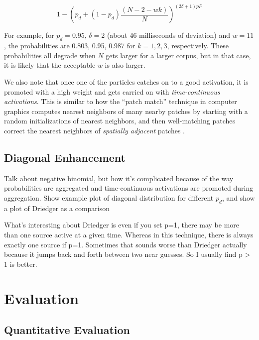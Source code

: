 \documentclass{article}
\begin{document}
\begin{equation}
    \label{eq:timeadjacentprobmodified}
    1 - \left( p_d + (1-p_d) \frac{(N-2-wk)}{N} \right)^{(2 \delta +1)pP}
\end{equation}

For example, for $p_d = 0.95$, $\delta=2$ (about 46 milliseconds of deviation) and $w = 11$, the probabilities are 0.803, 0.95, 0.987 for $k=1, 2, 3$, respectively.  These probabilities all degrade when $N$ gets larger for a larger corpus, but in that case, it is likely that the acceptable $w$ is also larger.

We also note that once one of the particles catches on to a good activation, it is promoted with a high weight and gets carried on with {\em time-continuous activations}.  This is similar to how the ``patch match'' technique in computer graphics \cite{Barnes:2009:PAR, Barnes:2010:TGP} computes nearest neighbors of many nearby patches by starting with a random initializations of nearest neighbors, and then well-matching patches correct the nearest neighbors of {\em spatially adjacent} patches \cite{Barnes:2009:PAR}.

\subsection{Diagonal Enhancement}

Talk about negative binomial, but how it's complicated because of the way probabilities are aggregated and time-continuous activations are promoted during aggregation.  Show example plot of diagonal distribution for different $p_d$, and show a plot of Driedger as a comparison

What's interesting about Driedger is even if you set p=1, there may be more than one source active at a given time.  Whereas in this technique, there is always exactly one source if p=1.  Sometimes that sounds worse than Driedger actually because it jumps back and forth between two near guesses.  So I usually find p > 1 is better.




\section{Evaluation}

\subsection{Quantitative Evaluation}
\label{sec:quantitativeevaluation}
\end{document}
